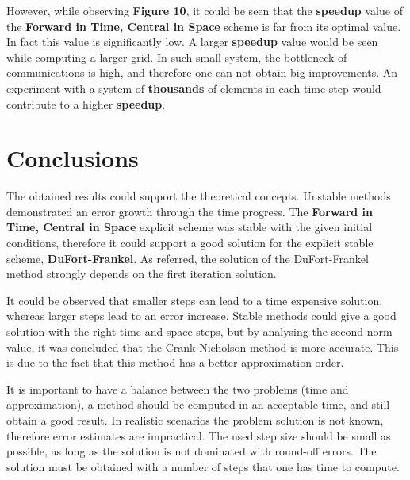 \documentclass[12pt]{article}
\begin{document}
\par However, while observing \textbf{Figure 10}, it could be seen that the \textbf{speedup} value of the \textbf{Forward in Time, Central in Space} scheme is far from its optimal value. In fact this value is significantly low. A larger \textbf{speedup} value would be seen while computing a larger grid. In such small system, the bottleneck of communications is high, and therefore one can not obtain big improvements. An experiment with a system of \textbf{thousands} of elements in each time step would contribute to a higher \textbf{speedup}.

\pagebreak
\section*{Conclusions}

\par The obtained results could support the theoretical concepts. Unstable methods demonstrated an error growth through the time progress. The \textbf{Forward in Time, Central in Space} explicit scheme was stable with the given initial conditions, therefore it could support a good solution for the explicit stable scheme, \textbf{DuFort-Frankel}. As referred, the solution of the DuFort-Frankel method strongly depends on the first iteration solution.
\par It could be observed that smaller steps can lead to a time expensive solution, whereas larger steps lead to an error increase. Stable methods could give a good solution with the right time and space steps, but by analysing the second norm value, it was concluded that the Crank-Nicholson method is more accurate. This is due to the fact that this method has a better approximation order.
\par It is important to have a balance between the two problems (time and approximation), a method should be computed in an acceptable time, and still obtain a good result. In realistic scenarios the problem solution is not known, therefore error estimates are impractical. The used step size should be small as possible, as long as the solution is not dominated with round-off errors. The solution must be obtained with a number of steps that one has time to compute. 
 
\end{document}
